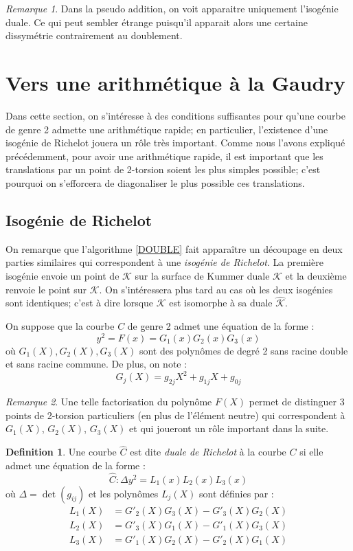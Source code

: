 \documentclass[a4paper,12pt]{article}
\theoremstyle{definition}
\newtheorem{definition}{Definition}[section]
\theoremstyle{remark}
\newtheorem{remarque}{Remarque}
\numberwithin{equation}{section}
\begin{document}
\begin{remarque}
Dans la pseudo addition, on voit apparaitre uniquement l'isogénie duale. Ce qui peut sembler étrange puisqu'il apparait alors une certaine dissymétrie contrairement au doublement.
\end{remarque}

\section{Vers une arithmétique à la Gaudry}

Dans cette section, on s'intéresse à des conditions suffisantes pour qu'une courbe de genre 2 admette une arithmétique rapide; en particulier, l'existence d'une isogénie de Richelot jouera un rôle très important. Comme nous l'avons expliqué précédemment, pour avoir une arithmétique rapide, il est important que les translations par un point de 2-torsion soient les plus simples possible; c'est pourquoi on s'efforcera de diagonaliser le plus possible ces translations.

\subsection{Isogénie de Richelot}

On remarque que l'algorithme \ref{DOUBLE} fait apparaître un découpage en deux parties similaires qui correspondent à une \emph{isogénie de Richelot}. La première isogénie envoie un point de $\mathcal{K}$ sur la surface de Kummer duale $\hat{\mathcal{K}}$ et la deuxième renvoie le point sur $\mathcal{K}$. On s'intéressera plus tard au cas où les deux isogénies sont identiques; c'est à dire lorsque $\mathcal{K}$ est isomorphe à sa duale $\hat{\mathcal{K}}$.

On suppose que la courbe $C$ de genre 2 admet une équation de la forme :
$$y^2 = F(x) = G_1(x)G_2(x)G_3(x)$$
où $G_1(X),G_2(X),G_3(X)$ sont des polynômes de degré 2 sans racine double et sans racine commune. De plus, on note :
$$G_j(X) = g_{2j}X^2 + g_{1j}X + g_{0j}$$

\begin{remarque}
Une telle factorisation du polynôme $F(X)$ permet de distinguer 3 points de 2-torsion particuliers (en plus de l'élément neutre) qui correspondent à $G_1(X)$, $G_2(X)$, $G_3(X)$ et qui joueront un rôle important dans la suite.
\end{remarque}

\begin{definition}
Une courbe $\hat{C}$ est dite \emph{duale de Richelot} à la courbe $C$ si elle admet une équation de la forme :
$$\hat{C} : \Delta y^2 = L_1(x)L_2(x)L_3(x)$$
où $\Delta = \det(g_{ij})$ et les polynômes $L_j(X)$ sont définies par :
\begin{align*}
L_1(X) &= G'_2(X)G_3(X) - G'_3(X)G_2(X) \\
L_2(X) &= G'_3(X)G_1(X) - G'_1(X)G_3(X) \\
L_3(X) &= G'_1(X)G_2(X) - G'_2(X)G_1(X)
\end{align*}
\end{definition}
\end{document}
